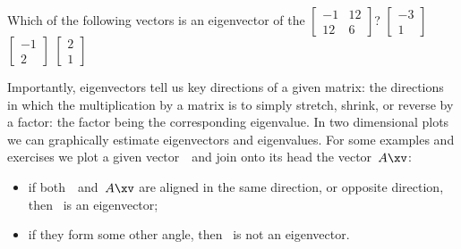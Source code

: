 \begin{activity}
Which of the following vectors is an eigenvector of the  \(\begin{bmatrix} -1&12\\12&6 \end{bmatrix}\)?
{\(\begin{bmatrix} -3\\1 \end{bmatrix}\)}
{\(\begin{bmatrix} -1\\2 \end{bmatrix}\)}
{\(\begin{bmatrix} 2\\1 \end{bmatrix}\)}
\end{activity}



Importantly, eigenvectors tell us key directions of a given matrix: the directions in which the multiplication by a matrix is to simply stretch, shrink, or reverse by a factor: the factor being the corresponding eigenvalue.
In two dimensional plots we can graphically estimate eigenvectors and eigenvalues.
For some examples and exercises we plot a given vector~\xv\ and join onto its head the vector~\(A\xv\): 
\begin{itemize}
\item if both~\xv\ and~\(A\xv\) are aligned in the same direction, or opposite direction, then \xv~is an eigenvector; 
\item if they form some other angle, then \xv~is not an eigenvector.
\end{itemize}
  


